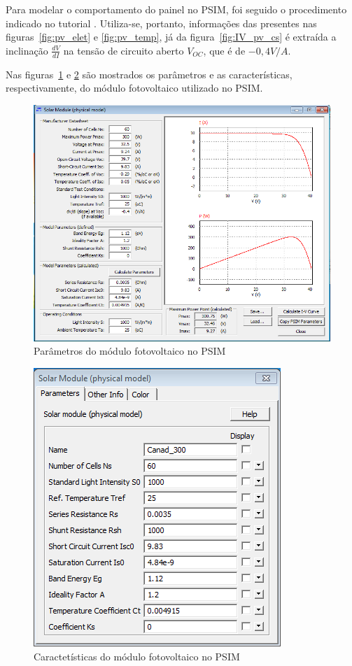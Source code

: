 \documentclass[
	12pt,				%
	openright,			%
	onseside,
	a4paper,			%
	english,			%
	french,				%
	spanish,			%
	brazil,				%
	]{abntex2}
\begin{document}
Para modelar o comportamento do painel no PSIM, foi seguido o procedimento indicado no tutorial \cite{PSIM_PV}. Utiliza-se, portanto, informações das presentes nas figuras~\ref{fig:pv_elet} e \ref{fig:pv_temp}, já da figura~\ref{fig:IV_pv_cs} é extraída a inclinação $\frac{dV}{dI}$ na tensão de circuito aberto $V_{OC}$, que é de $-0,4 V/A$.

Nas figuras~\ref{fig:pv_psim_param} e \ref{fig:pv_psim_carac} são mostrados os parâmetros e as características, respectivamente, do módulo fotovoltaico utilizado no PSIM.

\begin{figure}[htbp]%
	\begin{center}%
		\includegraphics[width=0.55 \linewidth]{PV_param}
		\caption{Parâmetros do módulo fotovoltaico no PSIM}
		\label{fig:pv_psim_param}
	\end{center}
\end{figure}

\begin{figure}[htbp]%
	\begin{center}%
		\includegraphics[width=0.55 \linewidth]{PV_carac}
		\caption{Caractetísticas do módulo fotovoltaico no PSIM}
		\label{fig:pv_psim_carac}
	\end{center}
\end{figure}
\end{document}

